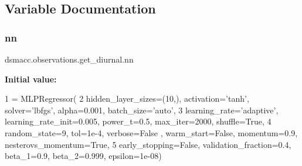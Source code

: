 \subsection{Variable Documentation}
\mbox{\label{namespacedsmacc_1_1observations_1_1get__diurnal_a2e635882309c8af963b3474c770b5dd1}} 
\subsubsection{\texorpdfstring{nn}{nn}}
{\footnotesize\ttfamily dsmacc.\+observations.\+get\+\_\+diurnal.\+nn}

{\bfseries Initial value\+:}
\begin{DoxyCode}
1 =  MLPRegressor(
2         hidden\_layer\_sizes=(10,),  activation=\textcolor{stringliteral}{'tanh'}, solver=\textcolor{stringliteral}{'lbfgs'}, alpha=0.001, batch\_size=\textcolor{stringliteral}{'auto'},
3         learning\_rate=\textcolor{stringliteral}{'adaptive'}, learning\_rate\_init=0.005, power\_t=0.5, max\_iter=2000, shuffle=\textcolor{keyword}{True},
4         random\_state=9, tol=1e-4, verbose=\textcolor{keyword}{False} , warm\_start=\textcolor{keyword}{False}, momentum=0.9, nesterovs\_momentum=\textcolor{keyword}{True},
5         early\_stopping=\textcolor{keyword}{False}, validation\_fraction=0.4, beta\_1=0.9, beta\_2=0.999, epsilon=1e-08)
\end{DoxyCode}
